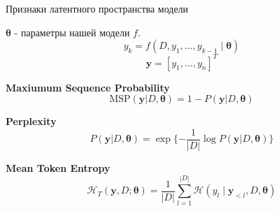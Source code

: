 \documentclass{beamer}
\begin{document}
\begin{frame}{Признаки латентного пространства модели}



$\pmb{\theta}$ - параметры нашей модели $f$. 
$$y_k = f(D, y_1, \dots, y_{k - 1} \mid \pmb{\theta})$$
$$\pmb{y} = [y_1, \dots, y_n]^T$$

\textbf{Maxiumum Sequence Probability}
\begin{equation}  
\text{MSP}(\pmb{y} | D, \pmb{\theta}) = 1 -P(\pmb{y} | D, \pmb{\theta})
\end{equation} 


\textbf{Perplexity}
\begin{equation}
P(\textbf{y} | D,  \pmb{\theta}) = \exp\{-\frac{1}{|D|}\log P(\textbf{y} | D, \pmb{\theta})\}
\end{equation} 

\textbf{Mean Token Entropy}
\begin{equation}
\mathcal{H}_T(\mathbf{y}, D ; \boldsymbol{\theta})=\frac{1}{|D|} \sum_{l=1}^{|D|} \mathcal{H}\left(y_l \mid \mathbf{y}_{<l}, D, \boldsymbol{\theta}\right)
\end{equation} 

\end{frame}
\end{document}
